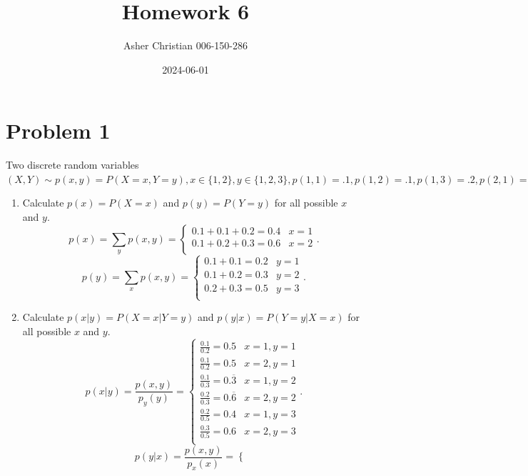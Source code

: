 \documentclass{article}
\title{Homework 6}
\author{Asher Christian 006-150-286}
\date{2024-06-01}
\begin{document}
    \maketitle
    \section{Problem 1}
    Two discrete random variables $(X, Y ) \sim p(x, y) = P (X = x, Y = y), x \in \{1, 2\}, y \in \{1, 2, 3\}, p(1, 1) = .1, p(1, 2) = .1, p(1, 3) = .2, p(2, 1) = .1, p(2, 2) = .2, p(2, 3) = .3.$
    \begin{enumerate}
        \item Calculate $p(x) = P(X = x)$ and $p(y) = P (Y = y)$ for all possible $x$ and $y$.
            \[
            p(x) = \sum_{y}^{}p(x,y) = 
            \begin{cases}
                0.1 + 0.1 + 0.2 = 0.4 & x = 1\\
                0.1 + 0.2 + 0.3 = 0.6 & x = 2\\
            \end{cases}
            .\] 
            \[
            p(y) = \sum_{x}^{}p(x,y) = 
            \begin{cases}
                0.1 + 0.1 = 0.2 & y = 1\\
                0.1 + 0.2 = 0.3 & y = 2\\
                0.2 + 0.3 = 0.5 & y = 3\\
            \end{cases}
            .\] 
        \item Calculate $p(x|y) = P (X = x|Y = y)$ and $p(y|x) = P (Y = y|X = x)$ for all possible $x$ and $y$.
            \[
            p(x|y) = \frac{p(x,y)}{p_y(y)} = 
            \begin{cases}
                \frac{0.1}{0.2} = 0.5 & x=1,y=1\\
                \frac{0.1}{0.2} = 0.5 & x=2,y=1\\
                \frac{0.1}{0.3} = 0.\overline{3} & x=1, y=2\\
                \frac{0.2}{0.3} = 0.\overline{6} & x=2, y=2\\
                \frac{0.2}{0.5} = 0.4 & x=1, y=3\\
                \frac{0.3}{0.5} = 0.6 & x=2, y=3\\
            \end{cases}
            .\] 
            \[
            p(y|x) = \frac{p(x,y)}{p_x(x)} =
            \begin{cases}

\end{cases}\]
\end{enumerate}
\end{document}
